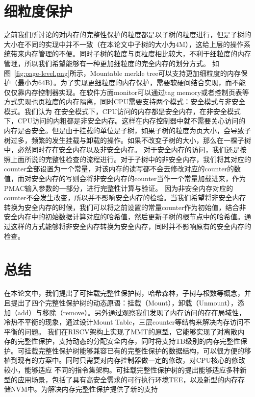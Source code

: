 \section{细粒度保护}
之前我们所讨论的对内存的完整性保护的粒度都是以子树的粒度进行，但是子树的大小在不同的实现中并不一致（在本论文中子树的大小为4M），这给上层的操作系统带来内存管理的不便。同时子树的粒度与页粒度相比较大，不利于细粒度的内存管理，所以我们希望能够有一种更加细粒度的完全内存的划分方式。
如图~\ref{fig:page-level.png}所示，Mountable merkle tree可以支持更加细粒度的内存保护（最小为64B）。为了实现更细粒度的内存保护，需要软硬间结合实现，而不能仅仅靠内存控制器实现。在软件方面monitor可以通过tag memory或者控制页表等方式实现也页粒度的内存隔离，同时CPU需要支持两个模式：安全模式与非安全模式。我们认为
在安全模式下，CPU访问的内存都是安全内存，在非安全模式下，CPU访问的内粗都是非安全内存。这样在内存控制器中就不需要关心访问的内存是否安全。但是由于挂载的单位是子树，如果子树的粒度为页大小，会导致子树过多，频繁的发生挂载与卸载的操作。如果不改变子树的大小，那么在一棵子树中，必然同时存在安全内存以及非安全内存。
对于安全内存的访问，我们还是按照上面所说的完整性检查的流程进行。对于子树中的非安全内存，我们将其对应的counter全部设置为一个常量，对该内存的读写都不会去修改对应的counter的数值，而对安全内存的写则会将非安全内存的counter当作一个常量加载进来，作为PMAC输入参数的一部分，进行完整性计算与验证。
因为非安全内存对应的counter不会发生改变，所以并不影响安全内存的检验。当我们希望将非安全内存转换为安全内存的时候，我们可以将之前设置的常量counter作为初始值，结合非安全内存中的初始数据计算对应的哈希值，然后更新子树的根节点中的哈希值。通过这样的方式能够将非安全内存转换为安全内存，同时并不影响原有的安全内存的检查。

\section{总结}
在本论文中，我们提出了可挂载完整性保护树，哈希森林，子树与根数等概念，并且提出了四个完整性保护树的动态原语：挂载（Mount），卸载（Unmount），添加（add）与移除（remove）。另外通过观察我们发现了内存访问的存在局域性，冷热不平衡的现象，通过设计Mount Table，三层counter等结构来解决内存访问不平衡的问题。
我们在RISCV架构上实现了MMT的原型，它能够实现了对离散内存的完整性保护，支持动态的分配安全内存，同时将支持TB级别的内存完整性保护。可挂载完整性保护树能够兼容已有的完整性保护的数据结构，可以很方便的移植到现有的方案中。同时只需要对内存控制器做一定的修改，对CPU核心的修改较小，能够适应
不同的指令集架构。可挂载完整性保护树的提出能够适应多种新型的应用场景，包括了具有高安全需求的可行执行环境TEE，以及新型的内存存储NVM中。为解决内存完整性保护提供了新的支持




